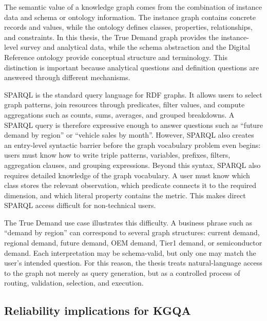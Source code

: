 \documentclass[
  12pt,
  english,
  oneside]{report}
\begin{document}
The semantic value of a knowledge graph comes from the combination of instance data and schema or ontology information. The instance graph contains concrete records and values, while the ontology defines classes, properties, relationships, and constraints. In this thesis, the True Demand graph provides the instance-level survey and analytical data, while the schema abstraction and the Digital Reference ontology provide conceptual structure and terminology. This distinction is important because analytical questions and definition questions are answered through different mechanisms.

SPARQL is the standard query language for RDF graphs. It allows users to select graph patterns, join resources through predicates, filter values, and compute aggregations such as counts, sums, averages, and grouped breakdowns. A SPARQL query is therefore expressive enough to answer questions such as ``future demand by region'' or ``vehicle sales by month''. However, SPARQL also creates an entry-level syntactic barrier before the graph vocabulary problem even begins: users must know how to write triple patterns, variables, prefixes, filters, aggregation clauses, and grouping expressions. Beyond this syntax, SPARQL also requires detailed knowledge of the graph vocabulary. A user must know which class stores the relevant observation, which predicate connects it to the required dimension, and which literal property contains the metric. This makes direct SPARQL access difficult for non-technical users.

The True Demand use case illustrates this difficulty. A business phrase such as ``demand by region'' can correspond to several graph structures: current demand, regional demand, future demand, OEM demand, Tier1 demand, or semiconductor demand. Each interpretation may be schema-valid, but only one may match the user's intended question. For this reason, the thesis treats natural-language access to the graph not merely as query generation, but as a controlled process of routing, validation, selection, and execution.


\subsection{Reliability implications for KGQA}
\label{subsec:kgqa-reliability-foundations}
\end{document}
